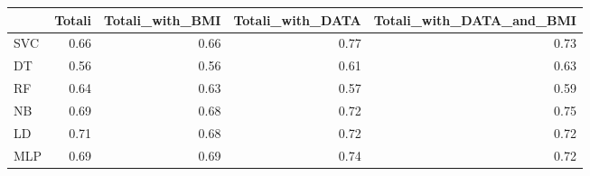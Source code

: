 \documentclass[12pt,italian]{report}
\begin{document}
\begin{table}[h]
	\begin{center}
		\begin{adjustbox}{max width=\textwidth}
			\begin{tabular}{lrrrr}
				\toprule
				{} &    Totali &  Totali\_with\_BMI &  Totali\_with\_DATA &  Totali\_with\_DATA\_and\_BMI \\
				\midrule
				SVC &  0.66 &         0.66 &          \cellcolor{orange}0.77 &                  0.73 \\
				DT  &  0.56 &         0.56 &          0.61 &                  0.63 \\
				RF  &  0.64 &         0.63 &          0.57 &                  0.59 \\
				NB  &  0.69 &         0.68 &          0.72 &                  \cellcolor{cyan}0.75 \\
				LD  &  0.71 &         0.68 &          \cellcolor{cyan}0.72 &                  0.72 \\
				MLP &  0.69 &         0.69 &          \cellcolor{cyan}0.74 &                  0.72 \\
				\bottomrule
			\end{tabular}
		\end{adjustbox}
	\end{center}
\end{table}
\end{document}
